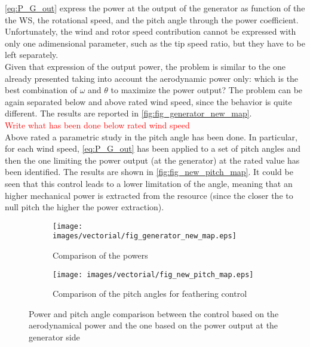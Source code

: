\autoref{eq:P_G_out} express the power at the output of the generator as function of the the WS, the rotational speed, and the pitch angle through the power coefficient. Unfortunately, the wind and rotor speed contribution cannot be expressed with only one adimensional parameter, such as the tip speed ratio, but they have to be left separately. \\
Given that expression of the output power, the problem is similar to the one already presented taking into account the aerodynamic power only: which is the best combination of $\omega$ and $\theta$ to maximize the power output? The problem can be again separated below and above rated wind speed, since the behavior is quite different. The results are reported in \autoref{fig:fig_generator_new_map}. \\
\textcolor{red}{Write what has been done below rated wind speed}\\ 
Above rated a parametric study in the pitch angle has been done. In particular, for each wind speed, \autoref{eq:P_G_out} has been applied to a set of pitch angles and then the one limiting the power output (at the generator) at the rated value has been identified. The results are shown in \autoref{fig:fig_new_pitch_map}. It could be seen that this control leads to a lower limitation of the angle, meaning that an higher mechanical power is extracted from the resource (since the closer the to null pitch the higher the power extraction).
\begin{figure}[htb]
  \begin{subfigure}{0.5\textwidth}
    \centering
    \texttt{[image: images/vectorial/fig\_generator\_new\_map.eps]}
    \caption{Comparison of the powers}
    \label{fig:fig_generator_new_map}
  \end{subfigure}
  \begin{subfigure}{0.5\textwidth}
    \centering
    \texttt{[image: images/vectorial/fig\_new\_pitch\_map.eps]}
    \caption{Comparison of the pitch angles for feathering control}
    \label{fig:fig_new_pitch_map}
  \end{subfigure}
  \caption{Power and pitch angle comparison between the control based on the aerodynamical power and the one based on the power output at the generator side}
  \label{fig:fig_blade_control_gen_side}
\end{figure}